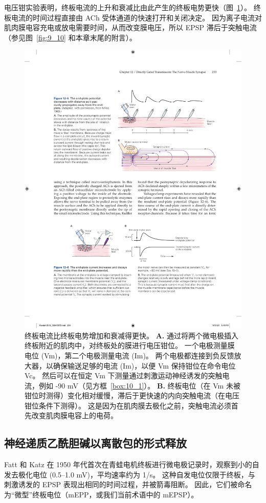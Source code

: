 电压钳实验表明，终板电流的上升和衰减比由此产生的终板电势更快（图~\ref{fig:12_6}）。
终板电流的时间过程直接由 ACh 受体通道的快速打开和关闭决定。
因为离子电流对肌肉膜电容充电或放电需要时间，从而改变膜电压，所以 EPSP 滞后于突触电流（参见图~\ref{fig:9_10} 和本章末尾的附言）。


\begin{figure}[htbp]
	\centering
	\includegraphics[width=0.7\linewidth]{chap12/fig_12_6}
	\caption{终板电流比终板电势增加和衰减得更快。
		\textbf{A.} 通过将两个微电极插入终板附近的肌肉中，对终板处的膜进行电压钳位。
		一个电极测量膜电位 (Vm)，第二个电极测量电流 (Im)。
		两个电极都连接到负反馈放大器，以确保输送足够的电流 (Im)，以便 Vm 保持钳位在命令电位 Vc。
		然后可以在恒定 Vm 下测量通过刺激运动神经诱发的突触电流，例如 -90 mV（见方框~\ref{box:10_1}）。
		\textbf{B.} 终板电位（在 Vm 未被钳位时测得）变化相对缓慢，滞后于更快速的内向突触电流（在电压钳位条件下测得）。
		这是因为在肌肉膜去极化之前，突触电流必须首先改变肌肉膜电容上的电荷。}
	\label{fig:12_6}
\end{figure}



\subsection{神经递质乙酰胆碱以离散包的形式释放}

Fatt 和 Katz 在 1950 年代首次在青蛙电机终板进行微电极记录时，观察到小的自发去极化电位 (0.5–1.0 mV)，平均速率约为 1/s。 
这种自发电位仅限于终板，与刺激诱发的 EPSP 表现出相同的时间过程，并被箭毒阻断。 
因此，它们被命名为“微型”终板电位（mEPP，或我们当前术语中的 mEPSP）。


